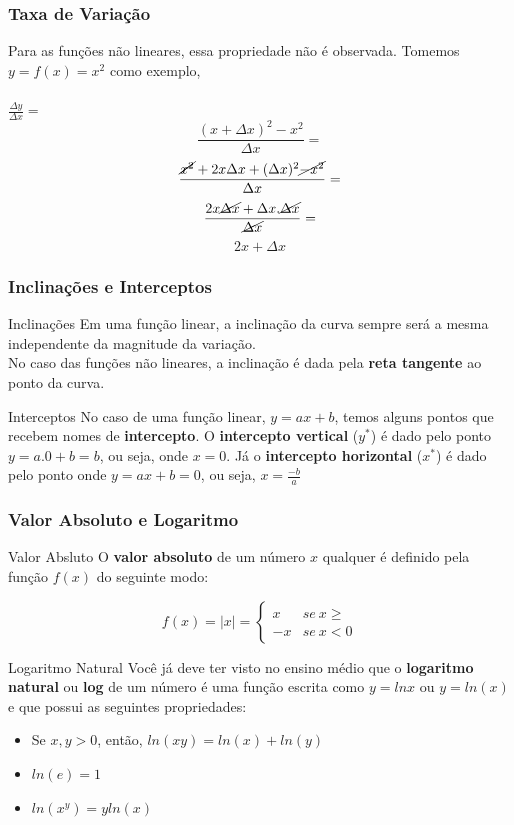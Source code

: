 \documentclass{beamer}[10]
\begin{document}
\begin{frame}
	\frametitle{Taxa de Variação}

	Para as funções não lineares, essa propriedade não é observada. Tomemos $y = f(x) = x^2$ como exemplo,
	\\~\\
	\Large $ \frac{\Delta y}{\Delta x} = $ \normalsize
	$$ \frac{(x + \Delta x)^2 - x^2}{\Delta x} = $$ 
	$$  \frac{\cancel{x^2} + 2x \Delta x + (\Delta x)^2 \cancel{-x^2}}{\Delta x} = $$
	$$  \frac{2x \cancel{\Delta x} + \Delta x . \cancel{\Delta x}}{\cancel{\Delta x}} = $$
	$$  2x + \Delta x $$
\end{frame}

\begin{frame}
	\frametitle{Inclinações e Interceptos}
	
	\begin{block}{Inclinações}
		Em uma função linear, a inclinação da curva sempre será a mesma independente da magnitude da variação.\\
		No caso das funções não lineares, a inclinação é dada pela \textbf{reta tangente} ao ponto da curva.
	\end{block}

	\begin{block}{Interceptos}
		No caso de uma função linear, $ y = ax + b$, temos alguns pontos que recebem nomes de \textbf{intercepto}. O \textbf{intercepto vertical} ($y^*$) é dado pelo ponto $y = a.0 + b = b$, ou seja, onde $x = 0$. Já o \textbf{intercepto horizontal} ($x^*$) é dado pelo ponto onde $y = ax + b = 0 $, ou seja, $ x = \frac{-b}{a}$
	\end{block}
\end{frame}

\begin{frame}
	\frametitle{Valor Absoluto e Logaritmo}

	\begin{block}{Valor Absluto}
		O \textbf{valor absoluto} de um número $x$ qualquer é definido pela função $f(x)$ do seguinte modo:

		\[ f(x) = |x| = \begin{cases} x & se \ x \geqslant \\ -x & se \ x < 0 \end{cases} \]
	\end{block}

	\begin{block}{Logaritmo Natural}
		Você já deve ter visto no ensino médio que o \textbf{logaritmo natural} ou \textbf{log} de um número é uma função escrita como $y = lnx$ ou $y = ln(x)$ e que possui as seguintes propriedades:

		\begin{itemize}
			\item Se $x,y > 0$, então, $ ln(xy) = ln(x) + ln(y) $
			\item $ ln(e) = 1 $
			\item $ ln(x^y) = y ln(x) $
		\end{itemize}
	\end{block}
\end{frame}
\end{document}
